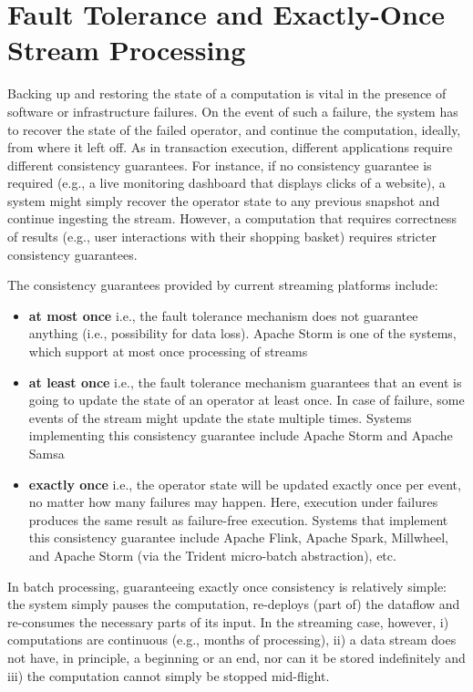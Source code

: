 \documentclass{llncs}
\begin{document}
\vspace{-3mm}
\section{Fault Tolerance and Exactly-Once Stream Processing}
\label{sec:fault-tolerance}
Backing up and restoring the state of a computation is vital in the presence of software or infrastructure failures. On the event of such a failure, the system has to recover the state of the failed operator, and continue the computation, ideally,  from where it left off. As in transaction execution, different applications require different consistency guarantees. For instance, if no consistency guarantee is required (e.g., a live monitoring dashboard that displays clicks of a website), a system might simply recover the operator state to any previous snapshot and continue ingesting the stream. However, a computation that requires correctness of results (e.g., user interactions with their shopping basket) requires stricter consistency guarantees. 

\vspace{3mm}
\noindent The consistency guarantees provided by current streaming platforms include:
\begin{itemize}
\item \textbf{at most once} i.e., the fault tolerance mechanism does not guarantee anything (i.e.,  possibility for data loss). Apache Storm is one of the systems, which support at most once processing of streams
\item \textbf{at least once} i.e., the fault tolerance mechanism guarantees that an event is going to update the state of an operator at least once. In case of failure, some events of the stream might update the state multiple times. Systems implementing this consistency guarantee include Apache Storm and Apache Samsa
\item \textbf{exactly once} i.e., the operator state will be updated exactly once per event, no matter how many failures may happen. Here, execution under failures produces the same result as failure-free execution. Systems that implement this consistency guarantee include Apache Flink, Apache Spark, Millwheel, and Apache Storm (via the Trident micro-batch abstraction), etc.
\end{itemize}

In batch processing, guaranteeing exactly once consistency is relatively simple: the system simply pauses the computation, re-deploys (part of) the dataflow and re-consumes the necessary parts of its input. In the streaming case, however, i) computations are continuous (e.g., months of processing), ii) a data stream does not have, in principle, a beginning or an end, nor can it be stored indefinitely and iii) the computation cannot simply be stopped mid-flight.
\end{document}
